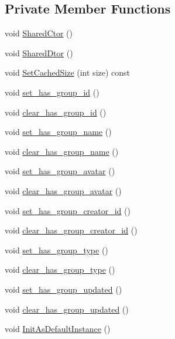 \subsection*{Private Member Functions}
\begin{DoxyCompactItemize}
\item 
void \hyperlink{class_i_m_1_1_base_define_1_1_client_group_info_ac6234b1069325c0ae1e5426e7a2df1f2}{Shared\+Ctor} ()
\item 
void \hyperlink{class_i_m_1_1_base_define_1_1_client_group_info_a353608560aa1fe2b9f2d23d2161ed5db}{Shared\+Dtor} ()
\item 
void \hyperlink{class_i_m_1_1_base_define_1_1_client_group_info_a2dda0c6c708f4584c82d315c9b461ee8}{Set\+Cached\+Size} (int size) const 
\item 
void \hyperlink{class_i_m_1_1_base_define_1_1_client_group_info_add5b633244119e1eb6cc9ef5a668f92f}{set\+\_\+has\+\_\+group\+\_\+id} ()
\item 
void \hyperlink{class_i_m_1_1_base_define_1_1_client_group_info_aaeaa5bb81068b3460e34e8f18cf07bd0}{clear\+\_\+has\+\_\+group\+\_\+id} ()
\item 
void \hyperlink{class_i_m_1_1_base_define_1_1_client_group_info_ac006b7fc1b51a54519effede80bdd085}{set\+\_\+has\+\_\+group\+\_\+name} ()
\item 
void \hyperlink{class_i_m_1_1_base_define_1_1_client_group_info_aeadd8c915fe064badfc674e0c8e64847}{clear\+\_\+has\+\_\+group\+\_\+name} ()
\item 
void \hyperlink{class_i_m_1_1_base_define_1_1_client_group_info_a286eca383a31735329eaaf51f3cf04b3}{set\+\_\+has\+\_\+group\+\_\+avatar} ()
\item 
void \hyperlink{class_i_m_1_1_base_define_1_1_client_group_info_a903feabb3168ed66a8ab8bfc473e8b76}{clear\+\_\+has\+\_\+group\+\_\+avatar} ()
\item 
void \hyperlink{class_i_m_1_1_base_define_1_1_client_group_info_acc1b71cec87824efd332e9447e1061df}{set\+\_\+has\+\_\+group\+\_\+creator\+\_\+id} ()
\item 
void \hyperlink{class_i_m_1_1_base_define_1_1_client_group_info_ad14490d3fbe44d0eae99a881d24cc889}{clear\+\_\+has\+\_\+group\+\_\+creator\+\_\+id} ()
\item 
void \hyperlink{class_i_m_1_1_base_define_1_1_client_group_info_afc3cb67fd7c99c3c7f5ee73e96f11562}{set\+\_\+has\+\_\+group\+\_\+type} ()
\item 
void \hyperlink{class_i_m_1_1_base_define_1_1_client_group_info_a45ebde81a5ddd59bb2f8b7d190b77473}{clear\+\_\+has\+\_\+group\+\_\+type} ()
\item 
void \hyperlink{class_i_m_1_1_base_define_1_1_client_group_info_a99c8508b6a157391a59434e6f3dbb1dd}{set\+\_\+has\+\_\+group\+\_\+updated} ()
\item 
void \hyperlink{class_i_m_1_1_base_define_1_1_client_group_info_a7413069127112bde8ad4b91f60bcf136}{clear\+\_\+has\+\_\+group\+\_\+updated} ()
\item 
void \hyperlink{class_i_m_1_1_base_define_1_1_client_group_info_a50d58d511491f63968272357e0bb1349}{Init\+As\+Default\+Instance} ()
\end{DoxyCompactItemize}
